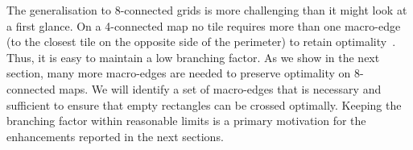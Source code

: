 The generalisation to 8-connected grids is more challenging than it might look
at a first glance.  On a 4-connected map no tile requires more than one
macro-edge (to the closest tile on the opposite side of the perimeter) to retain
optimality~\cite{harabor10}.  Thus, it is easy to maintain a low branching
factor.
As we show in the next section, many more macro-edges are
needed to preserve optimality on 8-connected maps. We will identify a set of
macro-edges that is necessary and sufficient to ensure that empty rectangles can
be crossed optimally.  Keeping the branching factor within reasonable limits is
a primary motivation for the enhancements reported in the next sections.

